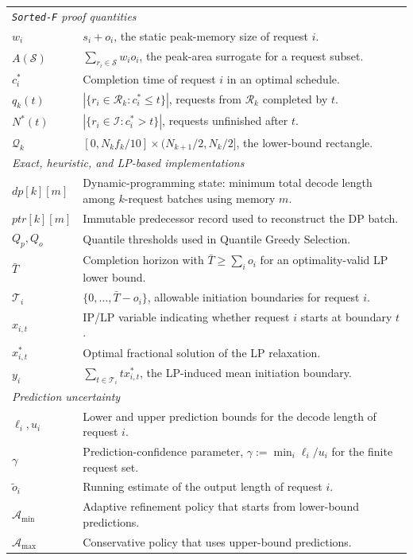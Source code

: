 \documentclass[nonblindrev]{informs3_hide}
\newcommand{\sortF}{\texttt{Sorted-F}}
\begin{document}
\begin{longtable}{p{}p{}}
\midrule
\multicolumn{2}{l}{\textit{\sortF{} proof quantities}}\\
$w_i$ & $s_i+o_i$, the static peak-memory size of request $i$. \\
$A(\mathcal S)$ & $\sum_{r_i\in\mathcal S}w_io_i$, the peak-area surrogate for a request subset. \\
$c_i^*$ & Completion time of request $i$ in an optimal schedule. \\
$q_k(t)$ & $|\{r_i\in\mathcal R_k:c_i^*\le t\}|$, requests from $\mathcal R_k$ completed by $t$. \\
$N^*(t)$ & $|\{r_i\in\mathcal I:c_i^*>t\}|$, requests unfinished after $t$. \\
$\mathcal Q_k$ & $[0,N_kf_k/10]\times(N_{k+1}/2,N_k/2]$, the lower-bound rectangle. \\

\midrule
\multicolumn{2}{l}{\textit{Exact, heuristic, and LP-based implementations}}\\
$dp[k][m]$ & Dynamic-programming state: minimum total decode length among $k$-request batches using memory $m$. \\
$ptr[k][m]$ & Immutable predecessor record used to reconstruct the DP batch. \\
$Q_p,Q_o$ & Quantile thresholds used in Quantile Greedy Selection. \\
$\bar T$ & Completion horizon with $\bar T\ge\sum_i o_i$ for an optimality-valid LP lower bound. \\
$\mathcal T_i$ & $\{0,\ldots,\bar T-o_i\}$, allowable initiation boundaries for request $i$. \\
$x_{i,t}$ & IP/LP variable indicating whether request $i$ starts at boundary $t$. \\
$x^*_{i,t}$ & Optimal fractional solution of the LP relaxation. \\
$y_i$ & $\sum_{t\in\mathcal T_i}t x^*_{i,t}$, the LP-induced mean initiation boundary. \\

\midrule
\multicolumn{2}{l}{\textit{Prediction uncertainty}}\\
$\ell_i,u_i$ & Lower and upper prediction bounds for the decode length of request $i$. \\
$\gamma$ & Prediction-confidence parameter, $\gamma:=\min_i \ell_i/u_i$ for the finite request set. \\
$\tilde{o}_i$ & Running estimate of the output length of request $i$. \\
$\mathcal A_{\min}$ & Adaptive refinement policy that starts from lower-bound predictions. \\
$\mathcal A_{\max}$ & Conservative policy that uses upper-bound predictions. \\


\end{longtable}
\end{document}
